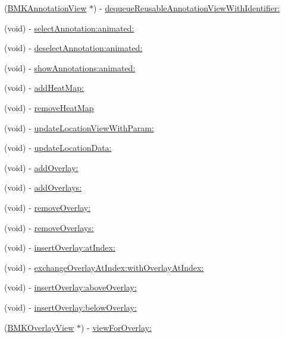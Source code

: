\begin{DoxyCompactItemize}
\item 
(\hyperlink{interface_b_m_k_annotation_view}{B\+M\+K\+Annotation\+View} $\ast$) -\/ \hyperlink{interface_b_m_k_map_view_a4d4aa7a171876f3f66add8f86cca1e8c}{dequeue\+Reusable\+Annotation\+View\+With\+Identifier\+:}
\item 
(void) -\/ \hyperlink{interface_b_m_k_map_view_a92dbf00c3eff2ede4d4ffd485c4059e0}{select\+Annotation\+:animated\+:}
\item 
(void) -\/ \hyperlink{interface_b_m_k_map_view_a3d6bbc91bc3b66463ee97b3c909e4999}{deselect\+Annotation\+:animated\+:}
\item 
(void) -\/ \hyperlink{interface_b_m_k_map_view_a62093e51bd52b357d909b75b4447b415}{show\+Annotations\+:animated\+:}
\item 
(void) -\/ \hyperlink{interface_b_m_k_map_view_a5945dec15b2d38ecf4b8efd4ce6b49e2}{add\+Heat\+Map\+:}
\item 
(void) -\/ \hyperlink{interface_b_m_k_map_view_a1337cb03abdb9ae730a2410f0fbd2f2f}{remove\+Heat\+Map}
\item 
(void) -\/ \hyperlink{interface_b_m_k_map_view_afc9842b45a41341b3ea5d2e632344382}{update\+Location\+View\+With\+Param\+:}
\item 
(void) -\/ \hyperlink{interface_b_m_k_map_view_a72c1c3b690379ecf804cc20ddf5840e9}{update\+Location\+Data\+:}
\item 
(void) -\/ \hyperlink{interface_b_m_k_map_view_af85ad6091568df29d9e7c3dea82a1a2b}{add\+Overlay\+:}
\item 
(void) -\/ \hyperlink{interface_b_m_k_map_view_ab7d29d948515cc6d947d6aa63f904168}{add\+Overlays\+:}
\item 
(void) -\/ \hyperlink{interface_b_m_k_map_view_a3be1f2a019df3ff971f6a36f142e55be}{remove\+Overlay\+:}
\item 
(void) -\/ \hyperlink{interface_b_m_k_map_view_a3eb7909fb1adce117c1de432fd5d816a}{remove\+Overlays\+:}
\item 
(void) -\/ \hyperlink{interface_b_m_k_map_view_adc0775a2651c1e4099f93d9c1bbffe3d}{insert\+Overlay\+:at\+Index\+:}
\item 
(void) -\/ \hyperlink{interface_b_m_k_map_view_a62c1c29b8e5b408ba0c40411a3c1f50f}{exchange\+Overlay\+At\+Index\+:with\+Overlay\+At\+Index\+:}
\item 
(void) -\/ \hyperlink{interface_b_m_k_map_view_ad94b45c4df7978e3a6095918323496d3}{insert\+Overlay\+:above\+Overlay\+:}
\item 
(void) -\/ \hyperlink{interface_b_m_k_map_view_a73dfe9f74d722b7b1fc477e791f34653}{insert\+Overlay\+:below\+Overlay\+:}
\item 
(\hyperlink{interface_b_m_k_overlay_view}{B\+M\+K\+Overlay\+View} $\ast$) -\/ \hyperlink{interface_b_m_k_map_view_aa88093440ad22f7af9cf9a36051f662d}{view\+For\+Overlay\+:}
\end{DoxyCompactItemize}
